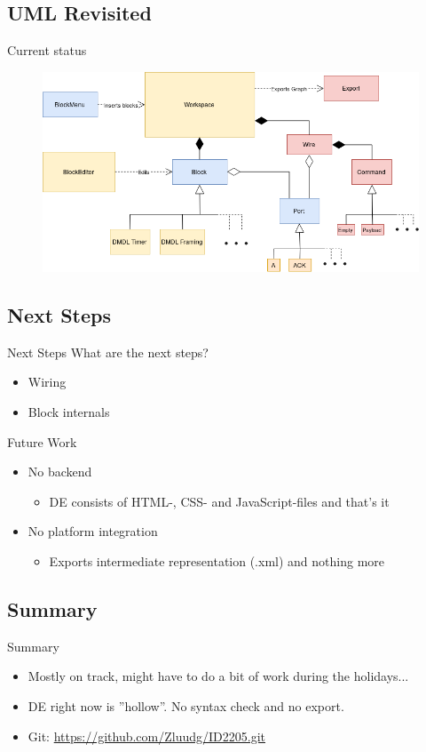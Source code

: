 \documentclass{beamer}
\begin{document}
\subsection{UML Revisited}
\begin{frame}{Current status}
\centering
	\begin{figure}
 		\includegraphics[width=\linewidth]{dmdl-editor-status.png}
 		\label{fig:uml-status}
	\end{figure}
\end{frame}


\subsection{Next Steps}
\begin{frame}{Next Steps}
	What are the next steps?
	\begin{itemize}
		\item Wiring
		\item Block internals
	\end{itemize}
\end{frame}

\begin{frame}{Future Work}
	\begin{itemize}
		\item No backend
		\begin{itemize}
			\item DE consists of HTML-, CSS- and JavaScript-files and that's it
		\end{itemize}
		\item No platform integration
		\begin{itemize}
			\item Exports intermediate representation (.xml) and nothing more
		\end{itemize}
	\end{itemize}
\end{frame}

\subsection*{Summary}
\begin{frame}{Summary}
\begin{itemize}
	\item Mostly on track, might have to do a bit of work during the holidays...
	\item DE right now is ''hollow''. No syntax check and no export.
	\item Git: \url{https://github.com/Zluudg/ID2205.git}
\end{itemize}
\end{frame}
\end{document}
